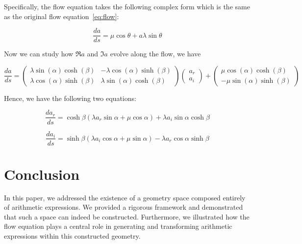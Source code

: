 \documentclass{article}
\numberwithin{definition}{section}
\numberwithin{lemma}{section}
\numberwithin{proposition}{section}
\numberwithin{corollary}{section}
\numberwithin{theorem}{section}
\begin{document}
Specifically, the flow equation takes the following complex form which is the same as the original flow equation~\eqref{eq:flow}:

\begin{equation}
    \label{eq:complexflow0}
    \frac{da}{ds}  = \mu \cos \theta + a \lambda \sin \theta
\end{equation}

Now we can study how $\Re a$ and $\Im a$ evolve along the flow, we have

\begin{equation}
\label{eq:complexflow2}
\frac{da}{ds}
=
\begin{pmatrix}
\lambda \sin(\alpha) \cosh(\beta) & -\lambda \cos(\alpha) \sinh(\beta) \\
\lambda \cos(\alpha) \sinh(\beta) & \lambda \sin(\alpha) \cosh(\beta)
\end{pmatrix}
\begin{pmatrix}
a_r \\
a_i
\end{pmatrix}
+
\begin{pmatrix}
\mu \cos(\alpha) \cosh(\beta) \\
-\mu \sin(\alpha) \sinh(\beta)
\end{pmatrix}
\end{equation}

Hence, we have the following two equations:

\begin{equation}
\label{eq:complexflow4}
\frac{da_r}{ds} = \cosh \beta (\lambda a_r \sin \alpha  + \mu \cos \alpha) + \lambda a_i \sin \alpha \cosh \beta
\end{equation}

\begin{equation}
\label{eq:complexflow5}
\frac{da_i}{ds} = \sinh \beta (\lambda a_i \cos \alpha  + \mu \sin \alpha) - \lambda a_r \cos \alpha \sinh \beta
\end{equation}


\section{Conclusion}\label{sec:conclusion}

In this paper, we addressed the existence of a geometry space composed entirely of arithmetic expressions.
We provided a rigorous framework and demonstrated that such a space can indeed be constructed.
Furthermore, we illustrated how the flow equation plays a central role in generating and transforming arithmetic expressions within this constructed geometry.
\end{document}
